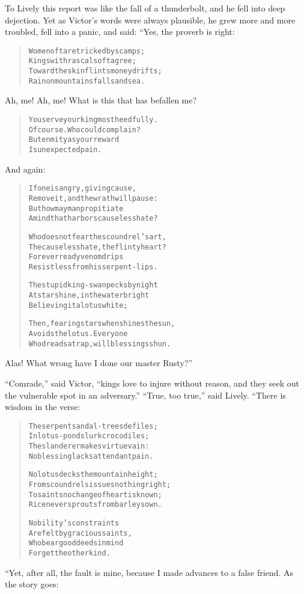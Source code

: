 \documentclass[article, twoside, 14pt]{memoir}
\renewenvironment{verbatim}{%
\begin{quote}%
\vskip -10pt%
\begin{alltt}\normalfont\large}{\end{alltt}%
\end{quote}%
\vskip -10pt
} %
\begin{document}
To Lively this report was like the fall of a thunderbolt, and he
fell into deep dejection. Yet as Victor's words were always
plausible, he grew more and more troubled, fell into a panic, and
said: “Yes, the proverb is right:

\begin{verbatim}
Women oft are tricked by scamps;
    Kings with rascals oft agree;
Toward the skinflints money drifts;
    Rain on mountains falls and sea.
\end{verbatim}
Ah, me! Ah, me! What is this that has befallen me?

\begin{verbatim}
You serve your king most heedfully.
    Of course. Who could complain?
But enmity as your reward
    Is unexpected pain.
\end{verbatim}
And again:

\begin{verbatim}
If one is angry, giving cause,
Remove it, and the wrath will pause:
But how may man propitiate
A mind that harbors causeless hate?

Who does not fear the scoundrel's art,
The causeless hate, the flinty heart?
For ever ready venom drips
Resistless from his serpent-lips.

The stupid king-swan pecks by night
At starshine, in the water bright
Believing it a lotus white;

Then, fearing stars when shines the sun,
Avoids the lotus. Everyone
Who dreads a trap, will blessings shun.
\end{verbatim}
Alas! What wrong have I done our master Rusty?”

``Comrade,'' said Victor,
``kings love to injure without reason, and they seek out the vulnerable spot in an adversary.''
``True, too true,'' said Lively. “There is wisdom in the verse:

\begin{verbatim}
The serpent sandal-trees defiles;
In lotus-ponds lurk crocodiles;
The slanderer makes virtue vain:
No blessing lacks attendant pain.

No lotus decks the mountain height;
From scoundrels issues nothing right;
To saints no change of heart is known;
Rice never sprouts from barley sown.

Nobility's constraints
Are felt by gracious saints,
Who bear good deeds in mind
Forget the other kind.
\end{verbatim}
“Yet, after all, the fault is mine, because I made advances
to a false friend. As the story goes:
\end{document}
